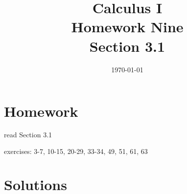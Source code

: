\documentclass[letterpaper, landscape]{exam}
\title{Calculus I \\ Homework Nine \\ Section 3.1}
\author{}
\date{\today}
\begin{document}
  \maketitle

  \section{Homework}
    \begin{itemize*}
      \item read Section 3.1
      \item exercises: 3-7, 10-15, 20-29, 33-34, 49, 51, 61, 63
    \end{itemize*}

  \ifprintanswers

  \section{Solutions}
\end{document}
